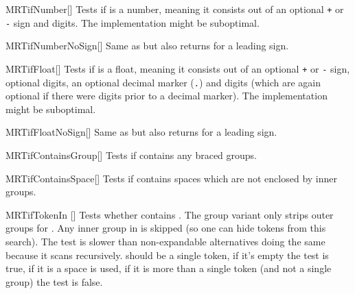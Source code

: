 \begin{describemacroTF}[G,N,GN]{MRTifNumber}[]
  Tests if  is a number, meaning it consists out of an optional
  \texttt{+} or \texttt{-} sign and digits. The implementation might be
  suboptimal.
\end{describemacroTF}

\begin{describemacroTF}[G,N,GN]{MRTifNumberNoSign}[]
  Same as  but also returns  for a leading sign.
\end{describemacroTF}

\begin{describemacroTF}[G,N,GN]{MRTifFloat}[]
  Tests if  is a float, meaning it consists out of an optional
  \texttt{+} or \texttt{-} sign, optional digits, an optional decimal marker
  (\texttt{.}) and digits (which are again optional if there were digits prior
  to a decimal marker). The implementation might be suboptimal.
\end{describemacroTF}

\begin{describemacroTF}[G,N,GN]{MRTifFloatNoSign}[]
  Same as  but also returns  for a leading sign.
\end{describemacroTF}

\begin{describemacroTF}[G,N,GN]{MRTifContainsGroup}[]
  Tests if  contains any braced groups.
\end{describemacroTF}

\begin{describemacroTF}[G,N,GN]{MRTifContainsSpace}[]
  Tests if  contains spaces which are not enclosed by inner groups.
\end{describemacroTF}

\begin{describemacroTF}{MRTifTokenIn}
  []
  Tests whether  contains . The group variant only
  strips outer groups for . Any inner group in  is skipped (so one can hide tokens from this search). The test is slower
  than non-expandable alternatives doing the same because it scans  recursively.  should be a single token, if it's empty the
  test is true, if it is a space  is used, if it is
  more than a single token (and not a single group) the test is false.
\end{describemacroTF}

